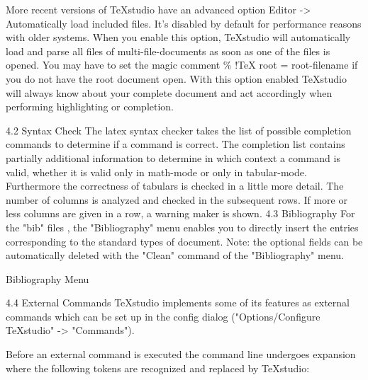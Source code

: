 \documentclass{article}
\begin{document}
	More recent versions of TeXstudio have an advanced option Editor -> Automatically load included files. It's disabled by default for performance reasons with older systems. When you enable this option, TeXstudio will automatically load and parse all files of multi-file-documents as soon as one of the files is opened. You may have to set the magic comment \% !TeX root = root-filename if you do not have the root document open. With this option enabled TeXstudio will always know about your complete document and act accordingly when performing highlighting or completion.
	
	4.2 Syntax Check
	The latex syntax checker takes the list of possible completion commands to determine if a command is correct. The completion list contains partially additional information to determine in which context a command is valid, whether it is valid only in math-mode or only in tabular-mode.
	Furthermore the correctness of tabulars is checked in a little more detail. The number of columns is analyzed and checked in the subsequent rows. If more or less columns are given in a row, a warning maker is shown.
	4.3 Bibliography
	For the "bib" files , the "Bibliography" menu enables you to directly insert the entries corresponding to the standard types of document.
	Note: the optional fields can be automatically deleted with the "Clean" command of the "Bibliography" menu.
	
	Bibliography Menu
	
	4.4 External Commands
	TeXstudio implements some of its features as external commands which can be set up in the config dialog ("Options/Configure TeXstudio" -> "Commands").
	
	Before an external command is executed the command line undergoes expansion where the following tokens are recognized and replaced by TeXstudio:
	
\end{document}

